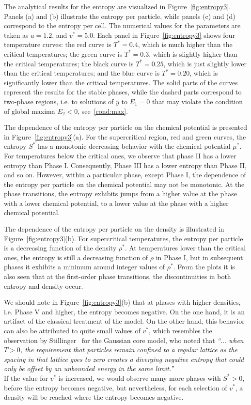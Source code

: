 \documentclass[entropy,article,submit,pdftex,moreauthors]{Definitions/mdpi}
\begin{document}
The analytical results for the entropy are visualized in Figure~\ref{fig:entropy3}. Panels (a) and (b) illustrate the entropy per particle, while panels (c) and (d) correspond to the entropy per cell.
The numerical values for the parameters are taken as $a=1.2$, and $v^*=5.0$. Each panel in Figure~\ref{fig:entropy3} shows four temperature curves: the red curve is $T^* = 0.4$, which is much higher than the critical temperatures; the green curve is $T^* = 0.3$, which is slightly higher than the critical temperatures; the black curve is $T^*=0.25$, which is just slightly lower than the critical temperatures; and the blue curve is $T^*=0.20$, which is significantly lower than the critical temperatures. The solid parts of the curves represent the results for the stable phases, while the dashed parts correspond to two-phase regions, i.e. to solutions of $\bar{y}$ to $E_1=0$ that may violate the condition of global maxima $E_2 < 0$, see~\eqref{cond:max}. 

The dependence of the entropy per particle on the chemical potential is presented in Figure~\ref{fig:entropy3}(a). For the supercritical region, red and green curves, the entropy $S^*$ has a monotonic decreasing behavior with the chemical potential $\mu^*$. For temperatures below the critical ones, we observe that phase II has a lower entropy than Phase I. Consequently, Phase III has a lower entropy than Phase II, and so on. However, within a particular phase, except Phase I, the dependence of the entropy per particle on the chemical potential may not be monotonic. At the phase transitions, the entropy exhibits jumps from a higher value at the phase with a lower chemical potential, to a lower value at the phase with a higher chemical potential.

The dependence of the entropy per particle on the density is illustrated in Figure~\ref{fig:entropy3}(b). For supercritical temperatures, the entropy per particle is a decreasing function of the density $\rho^*$. At temperatures lower than the critical ones, the entropy is still a decreasing function of $\rho$ in Phase I, but in subsequent phases it exhibits a minimum around integer values of $\rho^*$. From the plots it is also seen that at the first-order phase transitions, the discontinuities in both entropy and density occur.

We should note in Figure~\ref{fig:entropy3}(b) that at phases with higher densities, i.e. Phase V and higher, the entropy becomes negative. On the one hand, it is an artifact of the classical treatment of the model. On the other hand, this behavior can also be attributed to quite small values of $v^*$, which resembles the observation by Stillinger~\citep{Stillinger76} for the Gaussian core model, who noted that {\it{``$\ldots$ when $T>0$, the requirement that particles remain confined to a regular lattice as the spacing in that lattice goes to zero creates a diverging negative entropy that could only be offset by an unbounded energy in the same limit.''}}\\
If the value for $v^*$ is increased, we would observe many more phases with $S^*>0$, before the entropy becomes negative, but nevertheless, for each selection of $v^*$, a density will be reached where the entropy becomes negative.
\end{document}

